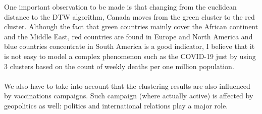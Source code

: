 \documentclass[11pt,a4paper]{article}
\begin{document}
\noindent
One important observation to be made is that changing from the euclidean
distance to the DTW algorithm, Canada moves from the
{\color{ForestGreen}green cluster} to the {\color{red}red cluster}. Although the
fact that {\color{ForestGreen}green countries} mainly cover the African
continent and the Middle East, {\color{red}red countries} are found in Europe
and North America and {\color{blue}blue countries} concentrate in South America
is a good indicator, I believe that it is not easy to model a complex phenomenon
such as the COVID-19 just by using $3$ clusters based on the count of weekly
deaths per one million population.\\
\\
We also have to take into account that the clustering results are also
influenced by vaccinations campaigns. Such campaign (where actually active) is
affected by geopolitics as well: politics and international relations play a
major role.
\end{document}
